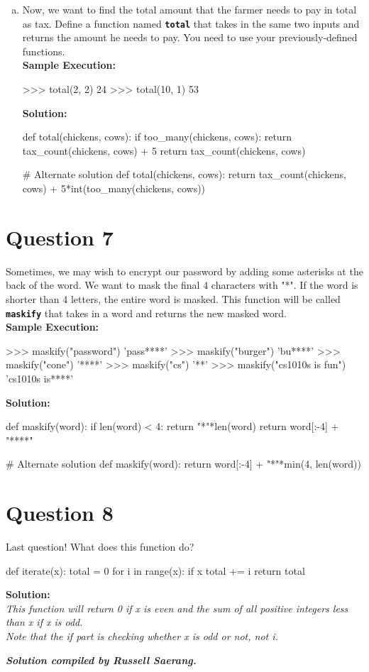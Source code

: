 \begin{enumerate}[(a)]
\item Now, we want to find the total amount that the farmer needs to pay in total as tax. Define a function named \texttt{\bfseries total}
that takes in the same two inputs and returns the amount he needs to pay. You need to use your previously-defined functions. \\
\textbf{Sample Execution:}
\begin{python}
>>> total(2, 2)
24
>>> total(10, 1)
53
\end{python}
\textbf{Solution:}
\begin{python}
def total(chickens, cows):
    if too_many(chickens, cows):
        return tax_count(chickens, cows) + 5
    return tax_count(chickens, cows)

# Alternate solution
def total(chickens, cows):
    return tax_count(chickens, cows) + 5*int(too_many(chickens, cows))
\end{python}
\end{enumerate}

\section{Question 7}
Sometimes, we may wish to encrypt our password by adding some asterisks at the back of the word. We want to mask the final 4 characters
with "*". If the word is shorter than 4 letters, the entire word is masked. This function will be called \texttt{\bfseries maskify} that takes in a word and
returns the new masked word. \\
\textbf{Sample Execution:}
\begin{python}
>>> maskify("password")
'pass****'
>>> maskify("burger")
'bu****'
>>> maskify("cone")
'****'
>>> maskify("cs")
'**'
>>> maskify("cs1010s is fun")
'cs1010s is****'
\end{python}
\textbf{Solution:}
\begin{python}
def maskify(word):
    if len(word) < 4:
        return "*"*len(word)
    return word[:-4] + "****"

# Alternate solution
def maskify(word):
    return word[:-4] + "*"*min(4, len(word))
\end{python}

\newpage
\section{Question 8}
Last question! What does this function do?
\begin{python}
def iterate(x):
    total = 0
    for i in range(x):
        if x %
            total += i
    return total
\end{python}
\textbf{Solution:} \\
\textit{This function will return 0 if x is even and the sum of all positive integers less than x if x is odd. \\
Note that the if part is checking whether x is odd or not, not i.}

\begin{flushright}
\vspace{2 cm}\textbf{\textit{Solution compiled by Russell Saerang.}}
\end{flushright}
